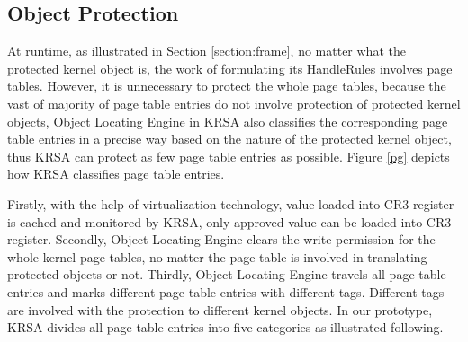 \documentclass[conference]{IEEEtran}
\begin{document}
\subsection{Object Protection} \label{section:handler}

At runtime, as illustrated in Section \ref{section:frame}, no matter what the protected kernel object is, the work of formulating its HandleRules involves page tables. However, it is unnecessary to protect the whole page tables, because the vast of majority of page table entries do not involve protection of protected kernel objects, Object Locating Engine in KRSA also classifies the corresponding page table entries in a precise way based on the nature of the protected kernel object, thus KRSA can protect as few page table entries as possible. Figure \ref{pg} depicts how KRSA classifies page table entries. 

Firstly, with the help of virtualization technology, value loaded into CR3 register is cached and monitored by KRSA, only approved value can be loaded into CR3 register. Secondly, Object Locating Engine clears the write permission for the whole kernel page tables, no matter the page table is involved in translating protected objects or not. Thirdly, Object Locating Engine travels all page table entries and marks different page table entries with different tags. Different tags are involved with the protection to different kernel objects. In our prototype, KRSA divides all page table entries into five categories as illustrated following. 
\end{document}
